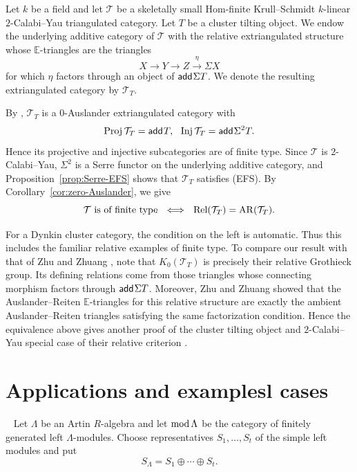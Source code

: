 \documentclass[11pt, twoside]{article}
\def\E{\mathbb{E}}
\numberwithin{equation}{section}
\newcommand{\add}{\mathsf{add}\hspace{.01in}}
\begin{document}
\begin{example}\label{ex:relative-cluster}
Let $k$ be a field and let $\mathcal T$ be a skeletally small Hom-finite
Krull--Schmidt $k$-linear $2$-Calabi--Yau triangulated category.  Let
$T$ be a cluster tilting object.  We endow the underlying additive category of
$\mathcal T$ with the relative extriangulated structure whose $\E$-triangles
are the triangles
$$
 X\longrightarrow Y\longrightarrow Z\xrightarrow{~\eta~}\Sigma X
$$
for which $\eta$ factors through an object of $\add\Sigma T$.  We denote the
resulting extriangulated category by $\mathcal T_T$.


By \cite[Section~3.3.6]{GorskyNakaokaPalu2023}, $\mathcal T_T$ is a
$0$-Auslander extriangulated category with
\[
 \Proj\mathcal T_T=\add T,
~~
 \Inj\mathcal T_T=\add\Sigma^2 T.
\]
Hence its projective and injective subcategories are of finite type.  Since
$\mathcal T$ is $2$-Calabi--Yau, $\Sigma^2$ is a Serre functor on the
underlying additive category, and Proposition~\ref{prop:Serre-EFS} shows
that $\mathcal T_T$ satisfies {(EFS)}.
By Corollary~\ref{cor:zero-Auslander}, we give
\[
 \mathcal T\text{ is of finite type}
 ~~\Longleftrightarrow~~
 \operatorname{Rel}(\mathcal T_T)=\operatorname{AR}(\mathcal T_T).
\]


For a Dynkin cluster category, the condition on the left is automatic.  Thus
this includes the familiar relative examples of finite type.  To compare our
result with that of Zhu and Zhuang \cite{ZhuZhuang2021}, note that
$K_0(\mathcal T_T)$ is precisely their relative Grothieck group.  Its defining
relations come from those triangles whose connecting morphism factors through
$\add\Sigma T$.  Moreover, Zhu and Zhuang
\cite[Lemma~4.13 and the proof of Theorem~4.14]{ZhuZhuang2021} showed that the
Auslander--Reiten $\E$-triangles for this relative structure are exactly the
ambient Auslander--Reiten triangles satisfying the same factorization
condition.  Hence the equivalence above gives another proof of the cluster
tilting object and $2$-Calabi--Yau special case of their relative criterion
\cite[Theorem~4.14]{ZhuZhuang2021}.



\end{example}

\section{Applications and examplesl cases}\label{sec:applications}

~
Let $\Lambda$ be an Artin $R$-algebra and let $\operatorname{mod}\Lambda$ be the
category of finitely generated left $\Lambda$-modules.  Choose
representatives $S_1,\dots,S_t$ of the simple left modules and put
\[
 S_\Lambda=S_1\oplus\cdots\oplus S_t.
\]
\end{document}
